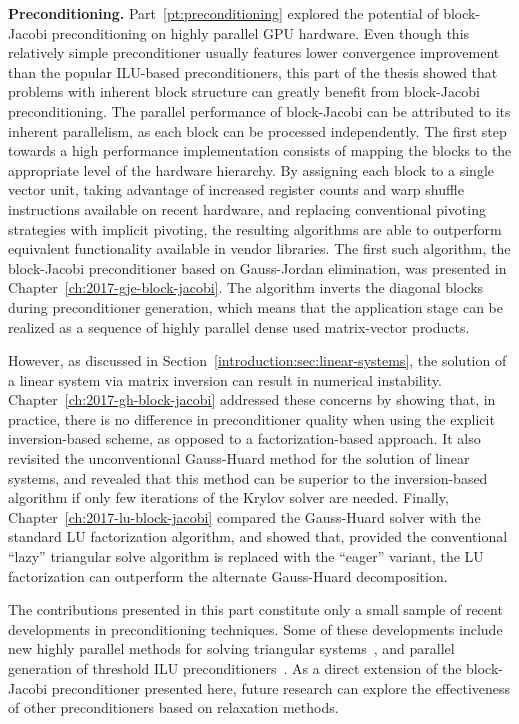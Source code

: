 \noindent\textbf{Preconditioning.}
Part~\ref{pt:preconditioning} explored the potential of block-Jacobi
preconditioning on highly parallel GPU hardware. Even though this relatively
simple preconditioner usually features lower convergence improvement than
the popular ILU-based preconditioners, this part of the thesis showed that
problems with inherent block structure can greatly benefit from block-Jacobi
preconditioning.  The parallel performance of block-Jacobi can be attributed to
its inherent parallelism, as each block can be processed independently. The
first step towards a high performance implementation consists of mapping the
blocks to the appropriate level of the hardware hierarchy. By assigning each
block to a single vector unit, taking advantage of increased register counts and
warp shuffle instructions available on recent hardware, and replacing
conventional pivoting strategies with implicit pivoting, the resulting
algorithms are able to outperform equivalent functionality available in vendor
libraries. The first such algorithm, the block-Jacobi preconditioner based on
Gauss-Jordan elimination, was presented in
Chapter~\ref{ch:2017-gje-block-jacobi}. The algorithm inverts the diagonal
blocks during preconditioner generation, which means that the application stage
can be realized as a sequence of highly parallel dense used matrix-vector
products.

However, as discussed in Section~\ref{introduction:sec:linear-systems}, the
solution of a linear system via matrix inversion can result in numerical
instability. Chapter~\ref{ch:2017-gh-block-jacobi} addressed these concerns by
showing that, in practice, there is no difference in preconditioner quality
when using the explicit inversion-based scheme, as opposed to a
factorization-based approach. It also revisited the unconventional Gauss-Huard
method for the solution of linear systems, and revealed that this method can be
superior to the inversion-based algorithm if only few iterations of the Krylov
solver are needed. Finally, Chapter~\ref{ch:2017-lu-block-jacobi} compared the
Gauss-Huard solver with the standard LU factorization algorithm, and showed
that, provided the conventional ``lazy'' triangular solve algorithm is replaced
with the ``eager'' variant, the LU factorization can outperform the alternate
Gauss-Huard decomposition.

The contributions presented in this part constitute only a small sample of
recent developments in preconditioning techniques. Some of these developments
include new highly parallel methods for solving triangular
systems~\cite{triangular-solve, isai, triangular-iterative}, and parallel
generation of threshold ILU preconditioners~\cite{ilut, ilut-gpu}. As a direct
extension of the block-Jacobi preconditioner presented here, future research can
explore the effectiveness of other preconditioners based on relaxation methods.


